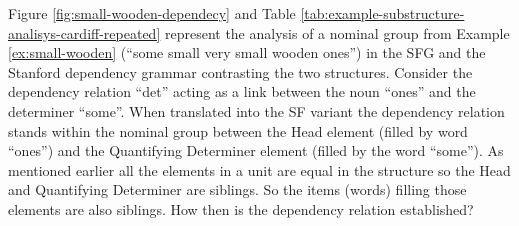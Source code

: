 
Figure \ref{fig:small-wooden-dependecy} and Table \ref{tab:example-substructure-analisys-cardiff-repeated} represent the analysis of a nominal group from Example \ref{ex:small-wooden} (``some small very small wooden ones'') in the SFG and the Stanford dependency grammar contrasting the two structures. Consider the dependency relation ``det'' acting as a link between the noun ``ones'' and the determiner ``some''. When translated into the SF variant the dependency relation stands within the nominal group between the Head element (filled by word ``ones'') and the Quantifying Determiner element (filled by the word ``some''). As mentioned earlier all the elements in a unit are equal in the structure so the Head and Quantifying Determiner are siblings. So the items (words) filling those elements are also siblings. How then is the dependency relation established? 




